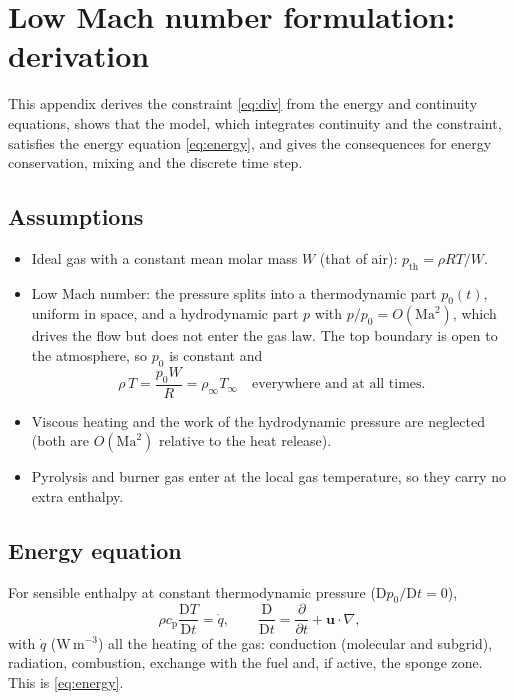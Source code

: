 \documentclass[11pt,a4paper]{article}
\newcommand{\vu}{\mathbf{u}}
\begin{document}
\appendix

\section{Low Mach number formulation: derivation}\label{app:lowmach}
This appendix derives the constraint \eqref{eq:div} from the energy and continuity equations, shows
that the model, which integrates continuity and the constraint, satisfies the energy equation
\eqref{eq:energy}, and gives the consequences for energy conservation, mixing and the discrete time step.

\subsection{Assumptions}
\begin{itemize}
  \item Ideal gas with a constant mean molar mass $W$ (that of air): $p_\text{th}=\rho RT/W$.
  \item Low Mach number: the pressure splits into a thermodynamic part $p_0(t)$, uniform in space, and a
        hydrodynamic part $p$ with $p/p_0=O(\mathrm{Ma}^2)$, which drives the flow but does not enter the
        gas law. The top boundary is open to the atmosphere, so $p_0$ is constant and
        \begin{equation}\label{eq:eos}
          \rho\,T=\frac{p_0W}{R}=\rho_\infty T_\infty\quad\text{everywhere and at all times.}
        \end{equation}
  \item Viscous heating and the work of the hydrodynamic pressure are neglected (both are $O(\mathrm{Ma}^2)$
        relative to the heat release).
  \item Pyrolysis and burner gas enter at the local gas temperature, so they carry no extra enthalpy.
\end{itemize}

\subsection{Energy equation}
For sensible enthalpy at constant thermodynamic pressure ($\mathrm{D}p_0/\mathrm{D}t=0$),
\begin{equation}\label{eq:enthalpy}
  \rho c_\text{p}\frac{\mathrm{D}T}{\mathrm{D}t}=\dot q,\qquad \frac{\mathrm{D}}{\mathrm{D}t}=\frac{\partial}{\partial t}+\vu\cdot\nabla,
\end{equation}
with $\dot q$ (W\,m$^{-3}$) all the heating of the gas: conduction (molecular and subgrid), radiation,
combustion, exchange with the fuel and, if active, the sponge zone. This is \eqref{eq:energy}.
\end{document}
